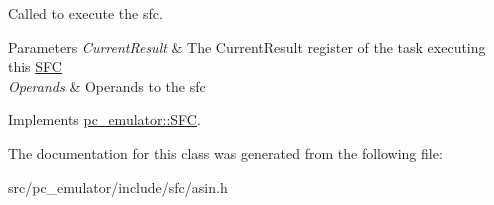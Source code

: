 Called to execute the sfc. 


\begin{DoxyParams}{Parameters}
{\em Current\+Result} & The Current\+Result register of the task executing this \hyperlink{classpc__emulator_1_1SFC}{S\+FC} \\
\hline
{\em Operands} & Operands to the sfc \\
\hline
\end{DoxyParams}


Implements \hyperlink{classpc__emulator_1_1SFC_ab206c80fc0e429c56672b4f6a0ca8635}{pc\+\_\+emulator\+::\+S\+FC}.



The documentation for this class was generated from the following file\+:\begin{DoxyCompactItemize}
\item 
src/pc\+\_\+emulator/include/sfc/asin.\+h\end{DoxyCompactItemize}
